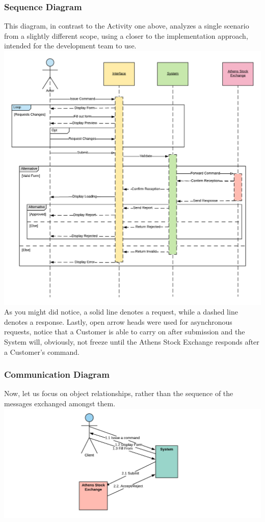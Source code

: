 \documentclass{article}
\begin{document}
\subsubsection{Sequence Diagram}
This diagram, in contrast to the Activity one above, analyzes a single scenario from a slightly different scope, using a closer to the implementation approach, intended for the development team to use.\\ 
\includegraphics[scale=0.25]{sequence}\\
As you might did notice, a solid line denotes a request, while a dashed line denotes a response. Lastly, open arrow heads were used for asynchronous requests, notice that a Customer is able to carry on after submission and the System will, obviously, not freeze until the Athens Stock Exchange responds after a Customer's command.

\subsubsection{Communication Diagram}
Now, let us focus on object relationships, rather than the sequence of the messages exchanged amongst them.\\
\includegraphics[scale=0.7]{communication}\\
\end{document}
